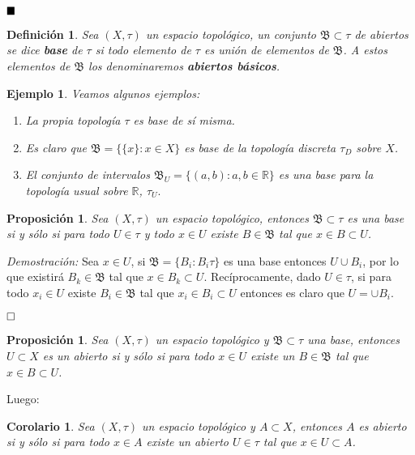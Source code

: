 \documentclass[12pt]{article}
\newtheorem{proposition}[theorem]{Proposición}
\newtheorem{definition}[theorem]{Definición}
\newtheorem{example}{Ejemplo}[theorem]
\newtheorem{corolario}{Corolario}[theorem]
\begin{document}
$\hfill \blacksquare$

\begin{definition}Sea $(X, \tau)$ un espacio topológico, un conjunto $\mathfrak{B} \subset \tau$ de abiertos se dice \textbf{base} de $\tau$ si todo elemento de $\tau$ es unión de elementos de $\mathfrak{B}$. A estos elementos de $\mathfrak{B}$ los denominaremos \textbf{abiertos básicos}.
\end{definition}

\begin{example}Veamos algunos ejemplos:
\begin{enumerate}
\item La propia topología $\tau$ es base de sí misma.
\item Es claro que $\mathfrak{B} = \lbrace \lbrace x \rbrace : x \in X \rbrace$ es base de la topología discreta $\tau_D$ sobre $	X$.
\item El conjunto de intervalos $\mathfrak{B}_U = \lbrace (a,b):a,b \in \mathbb{R} \rbrace$ es una base para la topología usual sobre $\mathbb{R}$, $\tau_U.$
\end{enumerate}
\end{example}

\begin{proposition}Sea $(X, \tau)$ un espacio topológico, entonces $\mathfrak{B} \subset \tau$ es una base si y sólo si para todo $U \in \tau$ y todo $x \in U$ existe $B \in \mathfrak{B}$ tal que $x \in B \subset U$.
\end{proposition}
\emph{Demostración: }Sea $x \in U$, si $\mathfrak{B} = \lbrace B_i : B_i \tau \rbrace $ es una base entonces $U \cup B_i$, por lo que existirá $B_k \in \mathfrak{B}$ tal que $x \in B_k \subset U$. Recíprocamente, dado $U \in \tau$, si para todo $x_i \in U$ existe $B_i \in \mathfrak{B}$ tal que $x_i \in B_i \subset U$ entonces es claro que $U = \cup B_i$.

$\hfill \square$

\begin{proposition}Sea $(X,\tau)$ un espacio topológico y $\mathfrak{B} \subset \tau$ una base, entonces $U \subset X$ es un abierto si y sólo si para todo $x \in U$ existe un $B \in \mathfrak{B}$ tal que $x \in B \subset U$.
\end{proposition}

Luego:

\begin{corolario}Sea $(X, \tau)$ un espacio topológico y $A \subset X$, entonces $A$ es abierto si y sólo si para todo $x \in A$ existe un abierto $U \in \tau$ tal que $x \in U \subset A$.
\end{corolario}
\end{document}
